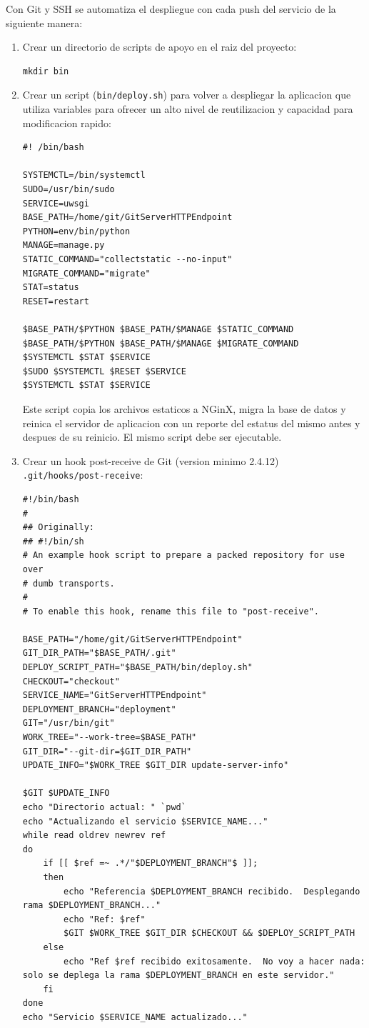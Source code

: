 Con Git y SSH se automatiza el despliegue con cada push del servicio de la siguiente manera:
\begin{enumerate}
	\item Crear un directorio de scripts de apoyo en el raiz del proyecto:
    \begin{lstlisting}
mkdir bin
    \end{lstlisting}
    \item Crear un script (\texttt{bin/deploy.sh}) para volver a despliegar la aplicacion que utiliza variables para ofrecer un alto nivel de reutilizacion y capacidad para modificacion rapido:
    \begin{lstlisting}
#! /bin/bash

SYSTEMCTL=/bin/systemctl
SUDO=/usr/bin/sudo
SERVICE=uwsgi
BASE_PATH=/home/git/GitServerHTTPEndpoint
PYTHON=env/bin/python
MANAGE=manage.py
STATIC_COMMAND="collectstatic --no-input"
MIGRATE_COMMAND="migrate"
STAT=status
RESET=restart

$BASE_PATH/$PYTHON $BASE_PATH/$MANAGE $STATIC_COMMAND
$BASE_PATH/$PYTHON $BASE_PATH/$MANAGE $MIGRATE_COMMAND
$SYSTEMCTL $STAT $SERVICE
$SUDO $SYSTEMCTL $RESET $SERVICE
$SYSTEMCTL $STAT $SERVICE
    \end{lstlisting}
    Este script copia los archivos estaticos a NGinX, migra la base de datos y reinica el servidor de aplicacion con un reporte del estatus del mismo antes y despues de su reinicio. El mismo script debe ser ejecutable.
    \item Crear un hook post-receive de Git (version minimo 2.4.12) \\
    \texttt{.git/hooks/post-receive}:
    \begin{lstlisting}[breaklines=true]
#!/bin/bash
#
## Originally:
## #!/bin/sh
# An example hook script to prepare a packed repository for use over
# dumb transports.
#
# To enable this hook, rename this file to "post-receive".

BASE_PATH="/home/git/GitServerHTTPEndpoint"
GIT_DIR_PATH="$BASE_PATH/.git"
DEPLOY_SCRIPT_PATH="$BASE_PATH/bin/deploy.sh"
CHECKOUT="checkout"
SERVICE_NAME="GitServerHTTPEndpoint"
DEPLOYMENT_BRANCH="deployment"
GIT="/usr/bin/git"
WORK_TREE="--work-tree=$BASE_PATH"
GIT_DIR="--git-dir=$GIT_DIR_PATH"
UPDATE_INFO="$WORK_TREE $GIT_DIR update-server-info"

$GIT $UPDATE_INFO
echo "Directorio actual: " `pwd`
echo "Actualizando el servicio $SERVICE_NAME..."
while read oldrev newrev ref
do
    if [[ $ref =~ .*/"$DEPLOYMENT_BRANCH"$ ]];
    then
        echo "Referencia $DEPLOYMENT_BRANCH recibido.  Desplegando rama $DEPLOYMENT_BRANCH..."
        echo "Ref: $ref"
        $GIT $WORK_TREE $GIT_DIR $CHECKOUT && $DEPLOY_SCRIPT_PATH
    else
        echo "Ref $ref recibido exitosamente.  No voy a hacer nada: solo se deplega la rama $DEPLOYMENT_BRANCH en este servidor."
    fi
done
echo "Servicio $SERVICE_NAME actualizado..."


\end{lstlisting}
\end{enumerate}

